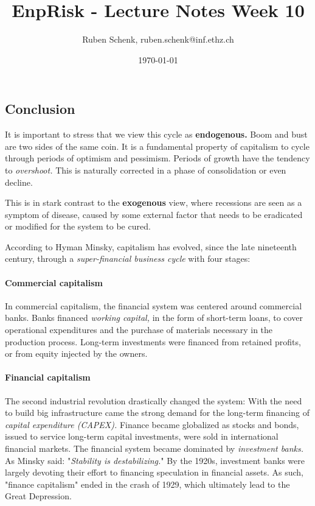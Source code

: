 \documentclass[a4paper]{extarticle}
\title{EnpRisk - Lecture Notes Week 10}
\author{Ruben Schenk, ruben.schenk@inf.ethz.ch}
\date{\today}
\begin{document}
\maketitle

\subsection{Conclusion}

It is important to stress that we view this cycle as \textbf{endogenous.} Boom and bust are two sides of the same coin. It is a fundamental property of capitalism to cycle through periods of optimism and pessimism. Periods of growth have the tendency to \textit{overshoot.} This is naturally corrected in a phase of consolidation or even decline.

This is in stark contrast to the \textbf{exogenous} view, where recessions are seen as a symptom of disease, caused by some external factor that needs to be eradicated or modified for the system to be cured.

According to Hyman Minsky, capitalism has evolved, since the late nineteenth century, through a \textit{super-financial business cycle} with four stages:

\paragraph{Commercial capitalism} In commercial capitalism, the financial system was centered around commercial banks. Banks financed \textit{working capital,} in the form of short-term loans, to cover operational expenditures and the purchase of materials necessary in the production process. Long-term investments were financed from retained profits, or from equity injected by the owners.

\paragraph{Financial capitalism} The second industrial revolution drastically changed the system: With the need to build big infrastructure came the strong demand for the long-term financing of \textit{capital expenditure (CAPEX).} Finance became globalized as stocks and bonds, issued to service long-term capital investments, were sold in international financial markets. The financial system became dominated by \textit{investment banks.} As Minsky said: "\textit{Stability is destabilizing.}" By the 1920s, investment banks were largely devoting their effort to financing speculation in financial assets. As such, "finance capitalism" ended in the crash of 1929, which ultimately lead to the Great Depression.
\end{document}
